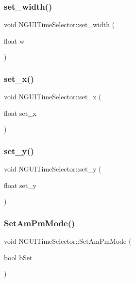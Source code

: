 \subsubsection{\texorpdfstring{set\+\_\+width()}{set\_width()}}
{\footnotesize\ttfamily void N\+G\+U\+I\+Time\+Selector\+::set\+\_\+width (\begin{DoxyParamCaption}\item[{float}]{w }\end{DoxyParamCaption})}

\hypertarget{class_n_g_u_i_time_selector_a648025f9d6ad70c28668bd37d347a12a}{}\label{class_n_g_u_i_time_selector_a648025f9d6ad70c28668bd37d347a12a} 
\subsubsection{\texorpdfstring{set\+\_\+x()}{set\_x()}}
{\footnotesize\ttfamily void N\+G\+U\+I\+Time\+Selector\+::set\+\_\+x (\begin{DoxyParamCaption}\item[{float}]{set\+\_\+x }\end{DoxyParamCaption})}

\hypertarget{class_n_g_u_i_time_selector_a22dc4315dc9cbae1415b15ea89575fe8}{}\label{class_n_g_u_i_time_selector_a22dc4315dc9cbae1415b15ea89575fe8} 
\subsubsection{\texorpdfstring{set\+\_\+y()}{set\_y()}}
{\footnotesize\ttfamily void N\+G\+U\+I\+Time\+Selector\+::set\+\_\+y (\begin{DoxyParamCaption}\item[{float}]{set\+\_\+y }\end{DoxyParamCaption})}

\hypertarget{class_n_g_u_i_time_selector_a52fda150907b8fea959f7746927cd9bc}{}\label{class_n_g_u_i_time_selector_a52fda150907b8fea959f7746927cd9bc} 
\subsubsection{\texorpdfstring{Set\+Am\+Pm\+Mode()}{SetAmPmMode()}}
{\footnotesize\ttfamily void N\+G\+U\+I\+Time\+Selector\+::\+Set\+Am\+Pm\+Mode (\begin{DoxyParamCaption}\item[{bool}]{b\+Set }\end{DoxyParamCaption})}

